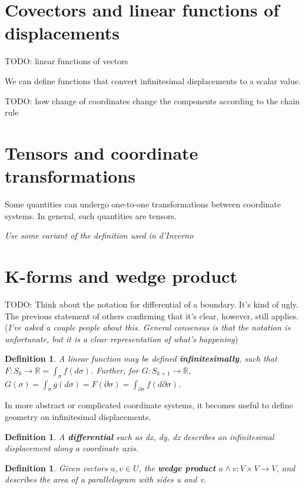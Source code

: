 \documentclass{book}
\newtheorem{defn}[equation]{Definition}
\begin{document}
\section{Covectors and linear functions of displacements}
TODO: linear functions of vectors

We can define functions that convert infinitesimal displacements to a scalar value. 

TODO: how change of coordinates change the components according to the chain rule

\section{Tensors and coordinate transformations}
Some quantities can undergo one-to-one transformations between coordinate systems. In general, such quantities are tensors. 

\emph{Use some variant of the definition used in d'Inverno}

\section{K-forms and wedge product}

TODO: Think about the notation for differential of a boundary. It's kind of ugly. The previous statement of others confirming that it's clear, however, still applies.  (\emph{I've asked a couple people about this. General consensus is that the notation is unfortunate, but it is a clear representation of what's happening})

\begin{defn}
	A linear function may be defined \textbf{infinitesimally}, such that $F : S_k \to \mathbb{R} = \int_{\sigma} f(d\sigma)$. Further, for $G : S_{k+1} \to \mathbb{R}$, $G(\sigma) = \int_{\sigma} g(d\sigma) = F(\partial\sigma) = \int_{\partial\sigma}f(d\partial\sigma)$. 
\end{defn}

In more abstract or complicated coordinate systems, it becomes useful to define geometry on infinitesimal displacements. 

\begin{defn}
	A \textbf{differential} such as dx, dy, dz describes an infinitesimal displacement along a coordinate axis. 
\end{defn}

\begin{defn}
	Given vectors $u, v \in U$, the \textbf{wedge product} $u \wedge v: V \times V \to V$, and describes the area of a parallelogram with sides u and v. 
\end{defn}
\end{document}
